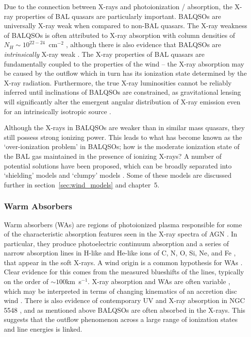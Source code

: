 Due to the connection between X-rays and photoionization / absorption, the 
X-ray properties of BAL quasars are particularly important. BALQSOs
are universally X-ray weak when compared to non-BAL quasars. 
The X-ray weakness of BALQSOs is often attributed to X-ray absorption 
with column densities of $N_H \sim 10^{22-24}$~cm$^{-2}$ 
\citep{gallagher1999,gallagher2002,green2001,grupe2003,stalin2011},
although there is also evidence that BALQSOs are {\em intrinsically}
X-ray weak \citep{sabra2001,clavel2006,morabito2013}.
The X-ray properties of BAL quasars are fundamentally coupled to 
the properties of the wind -- the X-ray absorption may be caused by 
the outflow which in turn has its ionization state 
determined by the X-ray radiation. Furthermore, the true X-ray 
luminosities cannot be reliably inferred until inclinations of BALQSOs are
constrained, as gravitational lensing will significantly alter the
emergent angular distribution of X-ray emission even for an intrinsically
isotropic source \citep{chen2013a, chen2013b}.

Although the X-rays in BALQSOs are weaker than in similar mass quasars,
they still possess strong ionizing power. This leads to what has become
known as the `over-ionization problem' in BALQSOs; how is the moderate 
ionization state of the BAL gas maintained in the presence of ionizing 
X-rays? A number of potential solutions have been proposed, which can be 
broadly separated into `shielding' models \citep{MCGV95,PK04} and `clumpy'
models \citep{dekool1995,hamann2013}. Some of these models are discussed
further in section~\ref{sec:wind_models} and chapter~5.

\subsubsection{Warm Absorbers}

Warm absorbers (WAs) are regions of photoionized plasma responsible for some
of the characteristic absorption features seen in the X-ray spectra of AGN 
\citep{reynolds1995}.
In particular, they produce photoelectric continuum absorption 
\citep[e.g.][]{halpern1984,cappi1996,kriss1996}
and a series of narrow absorption lines in H-like and He-like ions of 
C, N, O, Si, Ne, and Fe \citep{kaastra2000}, that appear in the soft X-rays.
A wind origin is a common hypothesis for WAs 
\citep[e.g.][]{krolikkriss2001}. Clear evidence for this 
comes from the measured blueshifts of the lines, typically on the order of 
$\sim100$km~s$^{-1}$. X-ray absorption and WAs are often
variable \citep{fabian1994,otani1996}, which may be interpreted in terms of 
changing kinematics of an accretion disc wind \citep{connolly2014}. 
There is also evidence of contemporary UV and X-ray absorption 
in NGC 5548 \citep{kaastra2014}, and as mentioned above BALQSOs 
are often absorbed in the X-rays. This suggests that the outflow phenomenon 
across a large range of ionization states and line energies is linked. 

